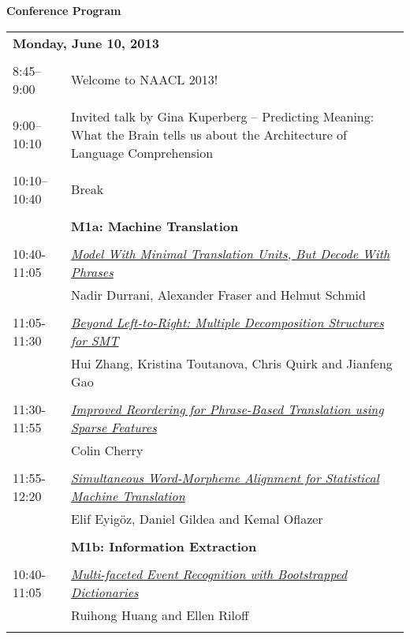 \setlength{\parindent}{0in}
\setlength{\parskip}{2ex}
\renewcommand{\baselinestretch}{0.87}

\begin{center}
{\Large \bf
  Conference Program
}
\end{center}
\vspace{3mm}
\begin{tabular}{p{20mm}p{128mm}}
\multicolumn{2}{l}{\bf Monday, June 10, 2013
} \\
\\
8:45--9:00 &   Welcome to NAACL 2013!
 \\
\\
9:00--10:10 &  Invited talk by Gina Kuperberg -- Predicting Meaning: What the Brain tells us about the Architecture of Language Comprehension
 \\
\\
10:10--10:40 & Break
 \\
\\
 & {\bf M1a: Machine Translation
} \\
\\
10:40-11:05 & \hyperlink{page.1}{\em Model With Minimal Translation Units, But Decode With Phrases}\\
         & Nadir Durrani, Alexander Fraser and Helmut Schmid \\
\\

11:05-11:30 & \hyperlink{page.12}{\em Beyond Left-to-Right: Multiple Decomposition Structures for SMT}\\
         & Hui Zhang, Kristina Toutanova, Chris Quirk and Jianfeng Gao \\
\\

11:30-11:55 & \hyperlink{page.22}{\em Improved Reordering for Phrase-Based Translation using Sparse Features}\\
         & Colin Cherry \\
\\

11:55-12:20 & \hyperlink{page.32}{\em Simultaneous Word-Morpheme Alignment for Statistical Machine Translation}\\
         & Elif Eyig\"{o}z, Daniel Gildea and Kemal Oflazer \\
\\

 & {\bf M1b: Information Extraction
} \\
\\
10:40-11:05 & \hyperlink{page.41}{\em Multi-faceted Event Recognition with Bootstrapped Dictionaries}\\
         & Ruihong Huang and Ellen Riloff \\
\\


\end{tabular}
